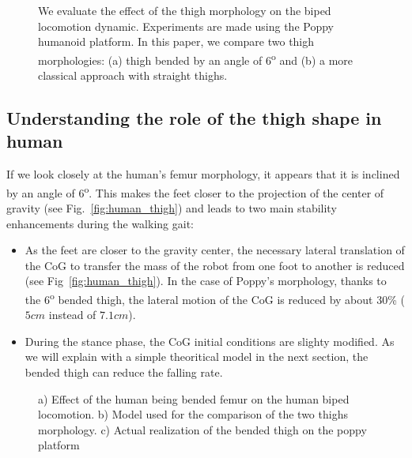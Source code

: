 

\begin{figure}[!t]
\centering
    \hfil
    \caption{We evaluate the effect of the thigh morphology on the biped locomotion dynamic.
    Experiments are made using the Poppy humanoid platform.
    In this paper, we compare two thigh morphologies: (a) thigh bended by an angle of 6\textsuperscript{o} and (b) a more classical approach with straight thighs.}
    \label{fig:poppy_compared}
\end{figure}


\subsection{Understanding the role of the thigh shape in human} %

If we look closely at the human's femur morphology, it appears that it is inclined by an angle of 6\textsuperscript{o}. This makes the feet closer to the projection of the center of gravity (see Fig.~\ref{fig:human_thigh}) and leads to two main stability enhancements during the walking gait:

\begin{itemize}
    \item As the feet are closer to the gravity center, the necessary lateral translation of the CoG to transfer the mass of the robot from one foot to another is reduced (see Fig~\ref{fig:human_thigh}). In the case of Poppy's morphology, thanks to the $6$\textsuperscript{o} bended thigh, the lateral motion of the CoG is reduced by about 30\% ($ 5 cm$ instead of $7.1 cm$).
    \item During the stance phase, the CoG initial conditions are slighty modified. As we will explain with a simple theoritical model in the next section, the bended thigh can reduce the falling rate.
\end{itemize}


\begin{figure}
\centering
    \hfil
    \hfil
    \caption{ a) Effect of the human being bended femur on the human biped locomotion.
    b) Model used for the comparison of the two thighs morphology.
    c) Actual realization of the bended thigh on the poppy platform}
    \label{fig:poppy_thigh}
\end{figure}


